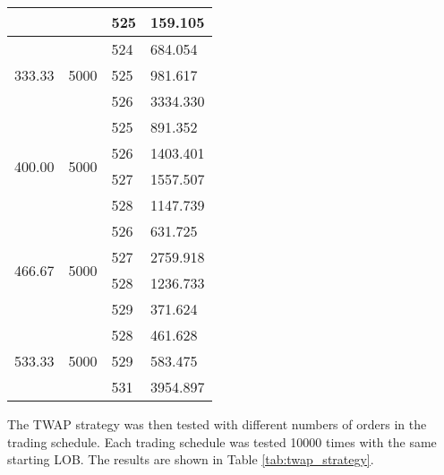 \begin{table}[htbp]
\begin{center}
\begin{tabular}{l|l|l|l}
                        &                          & 525   & 159.105  \\
\hline                        
\multirow{3}{*}{333.33} & \multirow{3}{*}{5000} & 524   & 684.054  \\
                        &                          & 525   & 981.617  \\
                        &                          & 526   & 3334.330 \\
\hline                        
\multirow{4}{*}{400.00} & \multirow{4}{*}{5000} & 525   & 891.352  \\
                        &                          & 526   & 1403.401 \\
                        &                          & 527   & 1557.507 \\
                        &                          & 528   & 1147.739 \\
\hline                        
\multirow{4}{*}{466.67} & \multirow{4}{*}{5000} & 526   & 631.725  \\
                        &                          & 527   & 2759.918 \\
                        &                          & 528   & 1236.733 \\
                        &                          & 529   & 371.624  \\
\hline                        
\multirow{3}{*}{533.33} & \multirow{3}{*}{5000} & 528   & 461.628  \\
                        &                          & 529   & 583.475  \\
                        &                          & 531   & 3954.897
\end{tabular}
\end{center}
\end{table}

The TWAP strategy was then tested with different numbers of orders in the trading schedule. Each trading schedule was tested 10000 times with the same starting LOB. The results are shown in Table \ref{tab:twap_strategy}.

